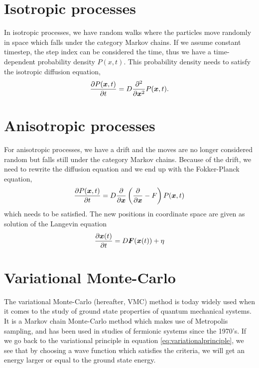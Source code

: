 \section{Isotropic processes}
In isotropic processes, we have random walks where the particles move randomly in space which falls under the category Markov chains. If we assume constant timestep, the step index can be considered the time, thus we have a time-dependent probability density $P(x,t)$. This probability density needs to satisfy the isotropic diffusion equation,
\begin{equation}
\frac{\partial P(\boldsymbol{{x}},t)}{\partial t}=D\frac{\partial^2}{\partial \boldsymbol{{x}}^2}P(\boldsymbol{{x}},t).
\end{equation}

\section{Anisotropic processes}
For anisotropic processes, we have a drift and the moves are no longer considered random but falls still under the category Markov chains. Because of the drift, we need to rewrite the diffusion equation and we end up with the Fokker-Planck equation,
\begin{equation}
\frac{\partial P(\boldsymbol{{x}},t)}{\partial t}=D\frac{\partial}{\partial \boldsymbol{{x}}}\left(\frac{\partial}{\partial \boldsymbol{{x}}}-F\right)P(\boldsymbol{{x}},t)
\end{equation}
which needs to be satisfied. The new positions in coordinate space are given as solution of the Langevin equation 
\begin{equation}
\frac{\partial \boldsymbol{{x}}(t)}{\partial t}=D\boldsymbol{{F}}(\boldsymbol{{x}}(t))+\eta
\end{equation}

\section{Variational Monte-Carlo} \label{subsec:vmc}
The variational Monte-Carlo (hereafter, VMC) method is today widely used when it comes to the study of ground state properties of quantum mechanical systems. It is a Markov chain Monte-Carlo method which makes use of Metropolis sampling, and has been used in studies of fermionic systems since the 1970's. \cite{deb_variational_2014} If we go back to the variational principle in equation \eqref{eq:variationalprinciple}, we see that by choosing a wave function which satisfies the criteria, we will get an energy larger or equal to the ground state energy. \bigskip

